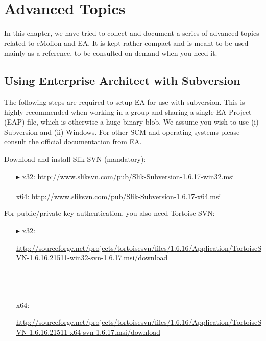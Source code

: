 \chapter{Advanced Topics}
\label{chap:advanced_topics}

In this chapter, we have tried to collect and document a series of advanced topics related to eMoflon and EA.
It is kept rather compact and is meant to be used mainly as a reference, to be consulted on demand when you need it.

\section{Using Enterprise Architect with Subversion}
The following steps are required to setup EA for use with subversion.
This is highly recommended when working in a group and sharing a single EA Project (EAP) file, which is otherwise a huge binary blob.
We assume you wish to use (i) Subversion and (ii) Windows.
For other SCM and operating systems please consult the official documentation from EA.

Download and install Slik SVN (mandatory):
\begin{enumerate}
  \item[$\blacktriangleright$] x32: \small{\url{http://www.sliksvn.com/pub/Slik-Subversion-1.6.17-win32.msi}}\\\\
   x64: {\small \url{http://www.sliksvn.com/pub/Slik-Subversion-1.6.17-x64.msi}}
\end{enumerate}

For public/private key authentication, you also need Tortoise SVN:
 
\begin{enumerate}
  \item[$\blacktriangleright$] x32: {\small \begin{minipage}{.95\textwidth}  \url{http://sourceforge.net/projects/tortoisesvn/files/1.6.16/Application/TortoiseSVN-1.6.16.21511-win32-svn-1.6.17.msi/download}
    \end{minipage}}\\\\\\
  x64: {\small\begin{minipage}{.9\textwidth}  \url{http://sourceforge.net/projects/tortoisesvn/files/1.6.16/Application/TortoiseSVN-1.6.16.21511-x64-svn-1.6.17.msi/download}\end{minipage}}
\end{enumerate}

